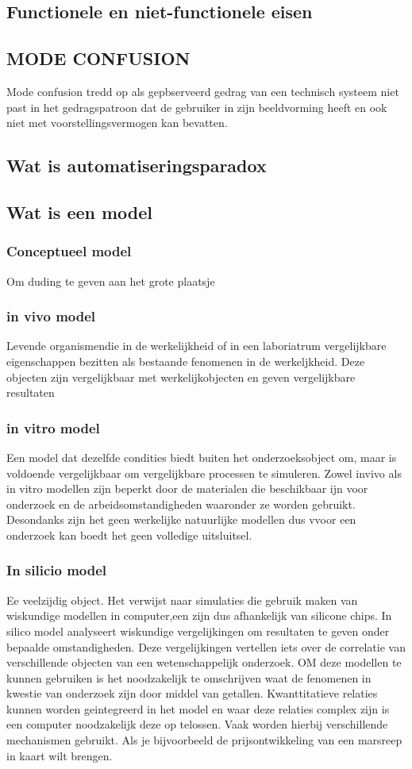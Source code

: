 \documentclass{article}
\begin{document}
\subsection{Functionele en niet-functionele eisen}

\subsection{MODE CONFUSION }
Mode confusion tredd op als gepbserveerd gedrag van een technisch systeem niet past in het gedragspatroon dat de gebruiker in zijn beeldvorming heeft  en ook niet met voorstellingsvermogen kan bevatten.
\subsection{Wat is automatiseringsparadox}


 
\subsection{Wat is een model}
\subsubsection{Conceptueel model}
Om duding te geven aan het grote plaatsje
\subsubsection{in vivo model}
Levende organismendie in de werkelijkheid of in een laboriatrum vergelijkbare eigenschappen bezitten als bestaande fenomenen in de werkeljkheid. Deze objecten zijn vergelijkbaar met werkelijkobjecten en geven vergelijkbare resultaten
\subsubsection{in vitro model}
Een model dat dezelfde condities biedt  buiten het onderzoeksobject om, maar is voldoende vergelijkbaar om vergelijkbare processen te simuleren.
Zowel invivo als in vitro modellen zijn beperkt door de materialen die beschikbaar ijn voor onderzoek en de arbeidsomstandigheden waaronder ze worden gebruikt. Desondanks zijn het geen werkelijke natuurlijke modellen dus vvoor een onderzoek kan boedt het geen volledige uitsluitsel.
\subsubsection{In silicio model}
Ee veelzijdig object. Het verwijst naar simulaties die gebruik maken van wiskundige modellen in computer,een zijn dus afhankelijk van silicone chips. In silico model analyseert  wiskundige vergelijkingen om resultaten te geven onder bepaalde omstandigheden. Deze vergelijkingen vertellen iets over de correlatie van verschillende objecten van een wetenschappelijk onderzoek. OM deze modellen te kunnen gebruiken is het noodzakelijk te omschrijven waat de fenomenen in kwestie van onderzoek zijn door middel van getallen. Kwanttitatieve relaties kunnen worden geintegreerd in het model en waar deze relaties complex zijn is een computer noodzakelijk deze op telossen. Vaak worden hierbij verschillende mechanismen gebruikt. Als je bijvoorbeeld de prijsontwikkeling van een marsreep in kaart wilt brengen.
\end{document}
